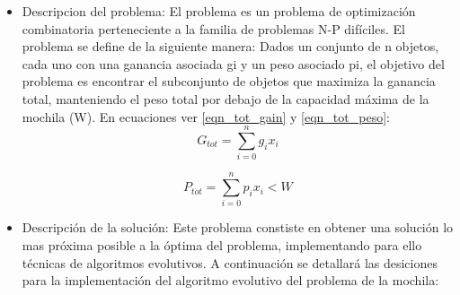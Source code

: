 \documentclass[9pt,conference]{IEEEtran}
\begin{document}
	\begin{itemize}	
	\item Descripcion del problema:
		El problema es un problema de optimizaci\'on combinatoria perteneciente a la familia de problemas N-P dif\'iciles. El problema se define de la siguiente manera:
		Dados un conjunto de n objetos, cada uno con una ganancia asociada gi y un peso asociado pi, el objetivo del problema es encontrar el subconjunto de objetos que maximiza la ganancia total, manteniendo el peso total por debajo de la capacidad m\'axima de la mochila (W). En ecuaciones ver \ref{eqn_tot_gain} y \ref{eqn_tot_peso}:
		\begin{equation}
		\label{eqn_tot_gain}
		G_{tot} = \sum\limits_{i=0}^{n} g_{i}x_{i}
		\end{equation}

		\begin{equation}
		\label{eqn_tot_peso}
		P_{tot} = \sum\limits_{i=0}^{n} p_{i}x_{i} < W
		\end{equation}

	
	\item Descripci\'on de la soluci\'on:
			Este problema constiste en obtener una soluci\'on lo mas pr\'oxima posible a la \'optima del problema, implementando para ello t\'ecnicas de algoritmos evolutivos.
			A continuaci\'on se detallar\'a las desiciones para la implementaci\'on del algoritmo evolutivo del problema de la mochila:
	\end{itemize}	
\end{document}
